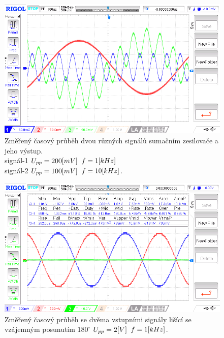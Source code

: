 \documentclass{article}
\begin{document}
\begin{figure}[H]
  \begin{minipage}[t]{0.48\textwidth}
    \centering
    \includegraphics[width=\textwidth]{LAB/NewFile3.png}
    Změřený časový průběh dvou různých signálů sumačním zesilovače a jeho výstup. \\
    signál-1 \(U_{pp} = 200\-[mV]\) \(f = 1\-[kHz]\) \\
    signál-2 \(U_{pp} = 100\-[mV]\) \(f = 10\-[kHz]\).
  \end{minipage}
  \hfill
  \begin{minipage}[t]{0.48\textwidth}
    \centering
    \includegraphics[width=\textwidth]{LAB/NewFile6.png}
    Změřený časový průběh se dvěma vstupními signály lišící se vzájemným posunutím \(180^\circ\) \(U_{pp} = 2\-[V]\) \(f = 1\-[kHz]\).
  \end{minipage}
\end{figure}
\end{document}
